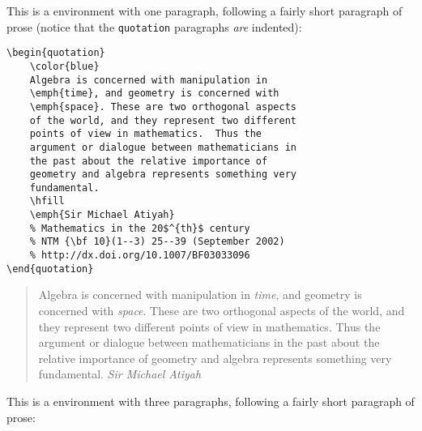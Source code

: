 This is a 
environment with one paragraph, following a fairly
short paragraph of prose (notice that the
\texttt{quotation} paragraphs \emph{are}
indented):

\begin{singlespace}
\color{darkblue}
\begin{verbatim}
\begin{quotation}
    \color{blue}
    Algebra is concerned with manipulation in
    \emph{time}, and geometry is concerned with
    \emph{space}. These are two orthogonal aspects
    of the world, and they represent two different
    points of view in mathematics.  Thus the
    argument or dialogue between mathematicians in
    the past about the relative importance of
    geometry and algebra represents something very
    fundamental.
    \hfill
    \emph{Sir Michael Atiyah}
    % Mathematics in the 20$^{th}$ century
    % NTM {\bf 10}(1--3) 25--39 (September 2002)
    % http://dx.doi.org/10.1007/BF03033096
\end{quotation}
\end{verbatim}
\end{singlespace}
%
\begin{quotation}
    \color{blue}
    Algebra is concerned with manipulation in
    \emph{time}, and geometry is concerned with
    \emph{space}. These are two orthogonal aspects
    of the world, and they represent two different
    points of view in mathematics.  Thus the
    argument or dialogue between mathematicians in
    the past about the relative importance of
    geometry and algebra represents something very
    fundamental.
    \hfill
    \emph{Sir Michael Atiyah}
\end{quotation}

This is a  environment with three
paragraphs, following a fairly short paragraph of prose:

